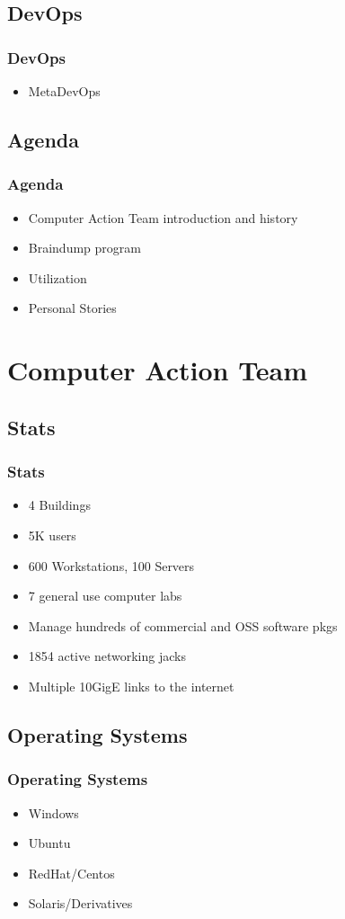 \documentclass{beamer}
\begin{document}
\subsection{DevOps}
\frame
{
    \frametitle{DevOps}
    \begin{itemize}
        \item MetaDevOps
    \end{itemize}
}

\subsection{Agenda}
\frame
{
    \frametitle{Agenda}
    \begin{itemize}
        \item Computer Action Team introduction and history
        \item Braindump program
        \item Utilization
        \item Personal Stories
    \end{itemize}
}

\section{Computer Action Team}
\subsection{Stats}
\frame
{
    \frametitle{Stats}
    \begin{itemize}
        \item 4 Buildings
        \item 5K users
        \item 600 Workstations, 100 Servers
        \item 7 general use computer labs
        \item Manage hundreds of commercial and OSS software pkgs
        \item 1854 active networking jacks
        \item Multiple 10GigE links to the internet
    \end{itemize}

}

\subsection{Operating Systems}
\frame
{
    \frametitle{Operating Systems}
    \begin{itemize}
        \item Windows
        \item Ubuntu
        \item RedHat/Centos
        \item Solaris/Derivatives
    \end{itemize}
}
\end{document}
